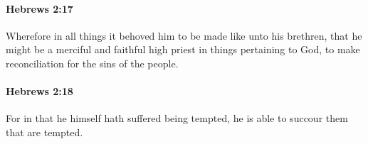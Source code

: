 		\paragraph{Hebrews 2:17} %
			\label{HEBREWS-2-17}

			Wherefore in all things it behoved him to be made like unto his brethren, that he might be a merciful and faithful high priest in things pertaining to God, to make reconciliation for the sins of the people.

			\begin{framed}
			\scriptsize
				\begin{compactdesc}
					\item[SBLG] 
				\end{compactdesc}
			\end{framed}

		\paragraph{Hebrews 2:18} %
			\label{HEBREWS-2-18}

			For in that he himself hath suffered being tempted, he is able to succour them that are tempted.

